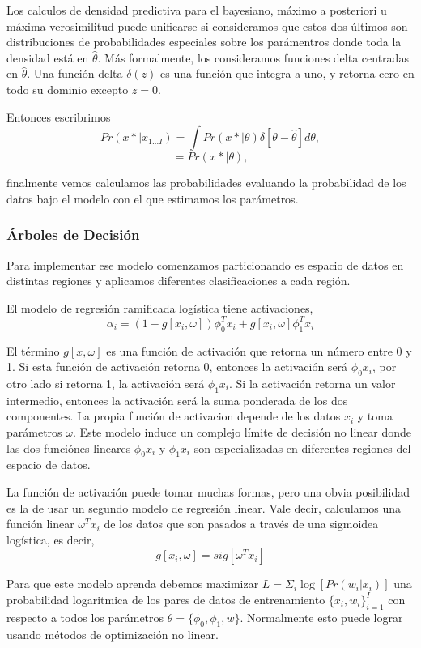 \documentclass[letter,12pt]{report}
\begin{document}
Los calculos de densidad predictiva para el bayesiano, máximo a posteriori u máxima
verosimilitud puede unificarse si consideramos que estos dos últimos son distribuciones
de probabilidades especiales sobre los parámentros donde toda la densidad está en
$\hat\theta$. Más formalmente, los consideramos funciones delta centradas en
$\hat\theta$. Una función delta $\delta(z)$ es una función que integra a uno, y retorna
cero en todo su dominio excepto $z=0$.

Entonces escribrimos
$$Pr(x*|x_{1...I})=\int Pr(x*|\theta) \delta[\theta - \hat\theta]d\theta,$$
$$=Pr(x*|\theta),$$

finalmente vemos calculamos las probabilidades evaluando la probabilidad de los datos
bajo el modelo con el que estimamos los parámetros.

\subsubsection{Árboles de Decisión}
Para implementar ese modelo\cite{Trees} comenzamos particionando es espacio de datos en distintas
regiones y aplicamos diferentes clasificaciones a cada región.

El modelo de regresión ramificada logística tiene activaciones,
$$\alpha_i=(1-g[x_i,\omega])\phi_0^T x_i+g[x_i,\omega]\phi_1^T x_i$$

El término $g[x,\omega]$ es una función de activación que retorna un número entre 0 y 1.
Si esta función de activación retorna 0, entonces la activación será $\phi_0x_i$, por
otro lado si retorna 1, la activación será $\phi_1x_i$. Si la activación retorna un valor
intermedio, entonces la activación será la suma ponderada de los dos componentes. La
propia función de activacion depende de los datos $x_i$ y toma parámetros $\omega$. Este
modelo induce un complejo límite de decisión no linear donde las dos funciónes lineares
$\phi_0x_i$ y $\phi_1x_i$ son especializadas en diferentes regiones del espacio de datos.

La función de activación puede tomar muchas formas, pero una obvia posibilidad es la de
usar un segundo modelo de regresión linear. Vale decir, calculamos una función linear
$\omega^Tx_i$ de los datos que son pasados a través de una sigmoidea logística, es decir,
$$g[x_i,\omega]=sig[\omega^Tx_i]$$

Para que este modelo aprenda debemos maximizar $L = \Sigma_i \log[Pr(w_i|x_i)]$ una
probabilidad logaritmica de los pares de datos de entrenamiento $\{x_i,w_i\}_{i=1}^I$ con
respecto a todos los parámetros $\theta=\{\phi_0,\phi_1,w\}$. Normalmente esto puede
lograr usando métodos de optimización no linear.
\end{document}
